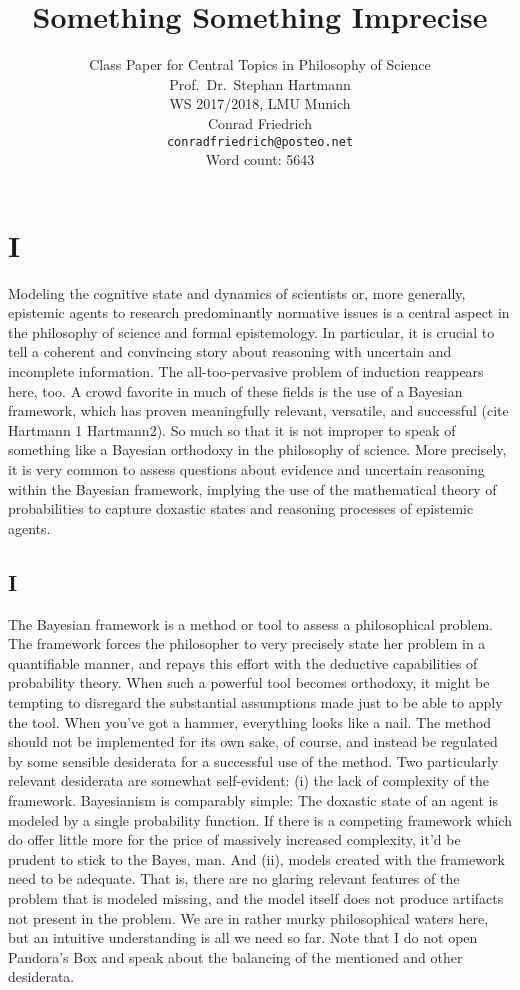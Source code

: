 \documentclass[11pt, a4paper]{scrartcl}
\title{\osfamily{}Something Something Imprecise}
\author{Class Paper for Central Topics in Philosophy of Science \\ Prof.\ Dr.\ Stephan Hartmann \\ WS 2017/2018, LMU Munich \\ Conrad Friedrich \\ \texttt{conradfriedrich@posteo.net} \\ Word count: 5643}
\begin{document}
\maketitle
\thispagestyle{empty}
\newpage
\section{I}
Modeling the cognitive state and dynamics of scientists or, more generally, epistemic agents to research predominantly normative issues is a central aspect in the philosophy of science and formal epistemology. In particular, it is crucial to tell a coherent and convincing story about reasoning with uncertain and incomplete information. The all-too-pervasive problem of induction reappears here, too. A crowd favorite in much of these fields is the use of a Bayesian framework, which has proven meaningfully relevant, versatile, and successful (cite Hartmann 1 Hartmann2). So much so that it is not improper to speak of something like a Bayesian orthodoxy in the philosophy of science. More precisely, it is very common to assess questions about evidence and uncertain reasoning within the Bayesian framework, implying the use of the mathematical theory of probabilities to capture doxastic states and reasoning processes of epistemic agents.

\subsection{I}
The Bayesian framework is a method or tool to assess a philosophical problem. The framework forces the philosopher to very precisely state her problem in a quantifiable manner, and repays this effort with the deductive capabilities of probability theory. When such a powerful tool becomes orthodoxy, it might be tempting to disregard the substantial assumptions made just to be able to apply the tool. When you've got a hammer, everything looks like a nail. The method should not be implemented for its own sake, of course, and instead be regulated by some sensible desiderata for a successful use of the method. Two particularly relevant desiderata are somewhat self-evident: (i) the lack of complexity of the framework. Bayesianism is comparably simple: The doxastic state of an agent is modeled by a single probability function. If there is a competing framework which do offer little more for the price of massively increased complexity, it'd be prudent to stick to the Bayes, man. And (ii), models created with the framework need to be adequate. That is, there are no glaring relevant features of the problem that is modeled missing, and the model itself does not produce artifacts not present in the problem. We are in rather murky philosophical waters here, but an intuitive understanding is all we need so far. Note that I do not open Pandora's Box and speak about the balancing of the mentioned and other desiderata.
\end{document}
